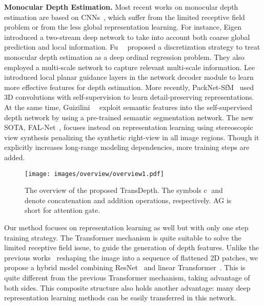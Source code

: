 \documentclass[10pt,twocolumn,letterpaper]{article}
\begin{document}
\noindent\textbf{Monocular Depth Estimation.} 
Most recent works on monocular depth estimation are based on CNNs~\cite{eigen2015predicting,liu2015deep,wang2015towards,laina2016deeper, fu2018deep,lee2019big,guizilini20203d,guizilini2020semantically}, which suffer from the limited receptive field problem or from the less global representation learning. For instance,
Eigen~\etal~\cite{eigen2014depth} introduced a two-stream deep network to take into account both coarse global prediction and local information. 
Fu~\etal~\cite{fu2018deep} proposed a discretization strategy to treat monocular depth estimation as a deep ordinal regression problem. They also employed a multi-scale network to capture relevant multi-scale information.
Lee~\etal~\cite{lee2019big} introduced local planar
guidance layers in the network decoder module to learn more effective features for depth estimation.
More recently, PackNet-SfM~\cite{guizilini20203d} used 3D convolutions with self-supervision to learn detail-preserving representations. At the same time, Guizilini~\etal~\cite{guizilini2020semantically} exploit semantic features into the self-supervised depth network by using a pre-trained semantic segmentation network. The new SOTA, FAL-Net~\cite{gonzalez2020forget}, focuses instead on representation learning using stereoscopic view synthesis penalizing the synthetic right-view in all image regions. Though it explicitly increases long-range modeling dependencies, more training steps are added.

\begin{figure*}[htb] \small
\centering
\texttt{[image: images/overview/overview1.pdf]}
\caption{The overview of the proposed TransDepth. The symbols \textcircled{c} and  denote concatenation and addition operations, respectively. AG is short for attention gate.}
\label{fig:overview}
\vspace{-0.4cm}
\end{figure*}

Our method focuses on representation learning as well but with only one step training strategy. The Transformer mechanism is quite suitable to solve the limited receptive field issue, to guide the generation of depth features. Unlike the previous works~\cite{zheng2020rethinking, dosovitskiy2020image} reshaping the image into a sequence of flattened 2D patches, we propose a hybrid model combining ResNet~\cite{he2016deep} and linear Transformer~\cite{dosovitskiy2020image}. 
This is quite different from the previous Transformer mechanism, taking advantage of both sides. This composite structure also holds another advantage: many deep representation learning methods can be easily transferred in this network.
\end{document}
